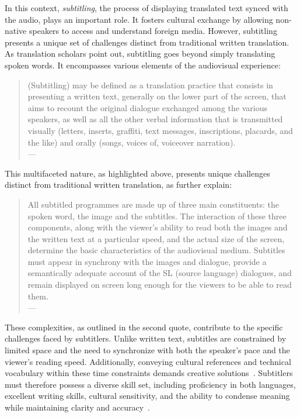 In this context, \emph{subtitling}, the process of displaying translated text synced with the audio, plays an important role. It fosters cultural exchange by allowing non-native speakers to access and understand foreign media. However, subtitling presents a unique set of challenges distinct from traditional written translation. As translation scholars \textcite{cintas2020subtitling} point out, subtitling goes beyond simply translating spoken words. It encompasses various elements of the audiovisual experience:

\begin{quote}
(Subtitling) may be defined as a translation practice that consists in presenting a written text, generally on the lower part of the screen, that aims to recount the original dialogue exchanged among the various speakers, as well as all the other verbal information that is transmitted visually (letters, inserts, graffiti, text messages, inscriptions, placards, and the like) and orally (songs, voices of, voiceover narration). \\
\phantom{abc} \hfill --- \textcite[9]{cintas2020subtitling}
\end{quote}

This multifaceted nature, as highlighted above, presents unique challenges distinct from traditional written translation, as \textcite{cintas2020subtitling} further explain:

\begin{quote}
All subtitled programmes are made up of three main constituents: the spoken word, the image and the subtitles. The interaction of these three components, along with the viewer’s ability to read both the images and the written text at a particular speed, and the actual size of the screen, determine the basic characteristics of the audiovisual medium. Subtitles must appear in synchrony with the images and dialogue, provide a semantically adequate account of the SL (source language) dialogues, and remain displayed on screen long enough for the viewers to be able to read them. \\
\phantom{abc}
\hfill --- \textcite[9]{cintas2020subtitling}
\end{quote}

These complexities, as outlined in the second quote, contribute to the specific challenges faced by subtitlers. Unlike written text, subtitles are constrained by limited space and the need to synchronize with both the speaker's pace and the viewer's reading speed. Additionally, conveying cultural references and technical vocabulary within these time constraints demands creative solutions~\parencite{matusov-etal-2019-customizing}. Subtitlers must therefore possess a diverse skill set, including proficiency in both languages, excellent writing skills, cultural sensitivity, and the ability to condense meaning while maintaining clarity and accuracy~\parencite{cintas2020subtitling}.

